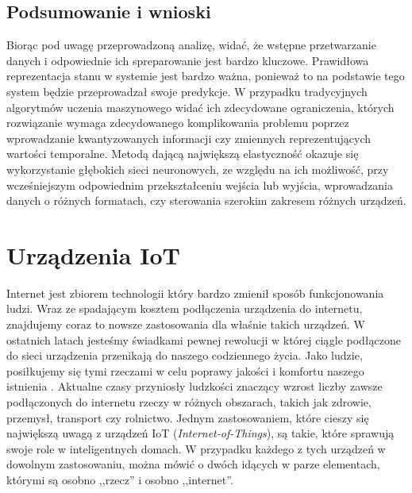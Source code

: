 \subsection{Podsumowanie i wnioski}
Biorąc pod uwagę przeprowadzoną analizę, widać, że wstępne przetwarzanie danych i odpowiednie ich spreparowanie jest bardzo kluczowe. Prawidłowa reprezentacja stanu w systemie jest bardzo ważna, ponieważ to na podstawie tego system będzie przeprowadzał swoje predykcje. W przypadku tradycyjnych algorytmów uczenia maszynowego widać ich zdecydowane ograniczenia, których rozwiązanie wymaga zdecydowanego komplikowania problemu poprzez wprowadzanie kwantyzowanych informacji czy zmiennych reprezentujących wartości temporalne. Metodą dającą największą elastyczność okazuje się wykorzystanie głębokich sieci neuronowych, ze względu na ich możliwość, przy wcześniejszym odpowiednim przekształceniu wejścia lub wyjścia, wprowadzania danych o różnych formatach, czy sterowania szerokim zakresem różnych urządzeń.

\section{Urządzenia IoT}



Internet jest zbiorem technologii który bardzo zmienił sposób funkcjonowania ludzi. Wraz ze spadającym kosztem podłączenia urządzenia do internetu, znajdujemy coraz to nowsze zastosowania dla właśnie takich urządzeń. W ostatnich latach jesteśmy świadkami pewnej rewolucji w której ciągle podłączone do sieci urządzenia przenikają do naszego codziennego życia. Jako ludzie, posiłkujemy się tymi rzeczami w celu poprawy jakości i komfortu naszego istnienia \cite{iot_improves_lifes}. Aktualne czasy przyniosły ludzkości znaczący wzrost liczby zawsze podłączonych do internetu rzeczy w różnych obszarach, takich jak zdrowie, przemysł, transport czy rolnictwo. Jednym zastosowaniem, które cieszy się największą uwagą z urządzeń IoT (\textit{Internet-of-Things}), są takie, które sprawują swoje role w inteligentnych domach. W przypadku każdego z tych urządzeń w dowolnym zastosowaniu, można mówić o dwóch idących w parze elementach, którymi są osobno ,,rzecz'' i osobno ,,internet''.

